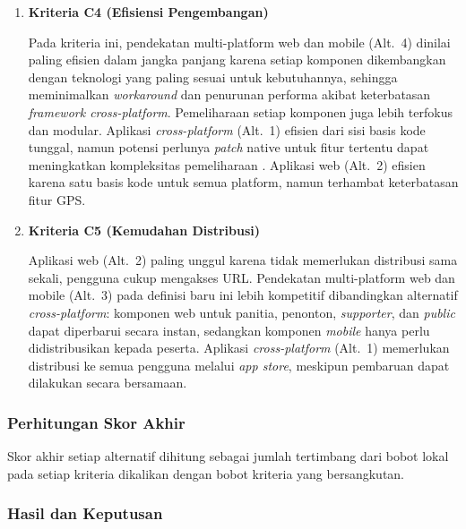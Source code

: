 \begin{enumerate}
    

    \item \textbf{Kriteria C4 (Efisiensi Pengembangan)}

    Pada kriteria ini, pendekatan multi-platform web dan mobile (Alt.~4) dinilai paling efisien dalam jangka panjang karena setiap komponen dikembangkan dengan teknologi yang paling sesuai untuk kebutuhannya, sehingga meminimalkan \textit{workaround} dan penurunan performa akibat keterbatasan \textit{framework cross-platform}. Pemeliharaan setiap komponen juga lebih terfokus dan modular. Aplikasi \textit{cross-platform} (Alt.~1) efisien dari sisi basis kode tunggal, namun potensi perlunya \textit{patch} native untuk fitur tertentu dapat meningkatkan kompleksitas pemeliharaan \cite{Nawrocki2021}. Aplikasi web (Alt.~2) efisien karena satu basis kode untuk semua platform, namun terhambat keterbatasan fitur GPS.

    

    \item \textbf{Kriteria C5 (Kemudahan Distribusi)}

    Aplikasi web (Alt.~2) paling unggul karena tidak memerlukan distribusi sama sekali, pengguna cukup mengakses URL. Pendekatan multi-platform web dan mobile (Alt.~3) pada definisi baru ini lebih kompetitif dibandingkan alternatif \textit{cross-platform}: komponen web untuk panitia, penonton, \textit{supporter}, dan \textit{public} dapat diperbarui secara instan, sedangkan komponen \textit{mobile} hanya perlu didistribusikan kepada peserta. Aplikasi \textit{cross-platform} (Alt.~1) memerlukan distribusi ke semua pengguna melalui \textit{app store}, meskipun pembaruan dapat dilakukan secara bersamaan.
    
    
\end{enumerate}


\subsubsection{Perhitungan Skor Akhir}

Skor akhir setiap alternatif dihitung sebagai jumlah tertimbang dari bobot lokal pada setiap kriteria dikalikan dengan bobot kriteria yang bersangkutan.



\subsubsection{Hasil dan Keputusan}

